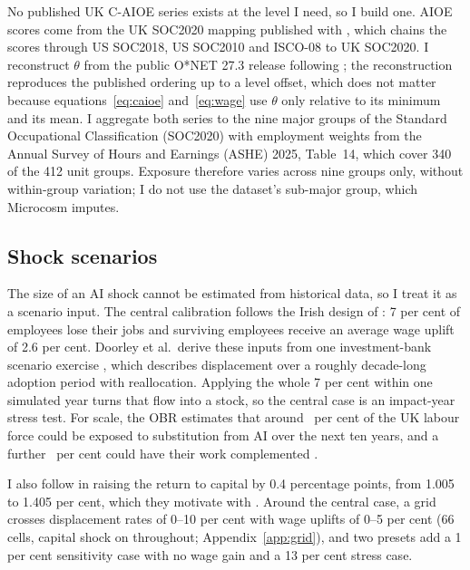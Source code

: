 No published UK C-AIOE series exists at the level I need, so I build one. AIOE scores come from the UK SOC2020 mapping published with \citet{dsit2023}, which chains the \citet{felten2021} scores through US SOC2018, US SOC2010 and ISCO-08 to UK SOC2020. I reconstruct $\theta$ from the public O*NET 27.3 release following \citet{pizzinelli2023}; the reconstruction reproduces the published ordering up to a level offset, which does not matter because equations~\eqref{eq:caioe} and~\eqref{eq:wage} use $\theta$ only relative to its minimum and its mean. I aggregate both series to the nine major groups of the Standard Occupational Classification (SOC2020) with employment weights from the Annual Survey of Hours and Earnings (ASHE) 2025, Table~14, which cover 340 of the 412 unit groups. Exposure therefore varies across nine groups only, without within-group variation; I do not use the dataset's sub-major group, which Microcosm imputes.

\subsection{Shock scenarios}
\label{sec:scenarios}

The size of an AI shock cannot be estimated from historical data, so I treat it as a scenario input. The central calibration follows the Irish design of \citet{doorley2026}: 7 per cent of employees lose their jobs and surviving employees receive an average wage uplift of 2.6 per cent. Doorley et al.\ derive these inputs from one investment-bank scenario exercise \citep{briggs2023}, which describes displacement over a roughly decade-long adoption period with reallocation. Applying the whole 7 per cent within one simulated year turns that flow into a stock, so the central case is an impact-year stress test. For scale, the OBR estimates that around \genObrFrsSubstitutionPct~per cent of the UK labour force could be exposed to substitution from AI over the next ten years, and a further \genObrFrsComplementPct~per cent could have their work complemented \citep[Box~4.1]{obr2026frs}.

I also follow \citet{doorley2026} in raising the return to capital by 0.4 percentage points, from 1.005 to 1.405 per cent, which they motivate with \citet{cazzaniga2024}. Around the central case, a grid crosses displacement rates of 0--10 per cent with wage uplifts of 0--5 per cent (66 cells, capital shock on throughout; Appendix~\ref{app:grid}), and two presets add a 1 per cent sensitivity case with no wage gain and a 13 per cent stress case.

